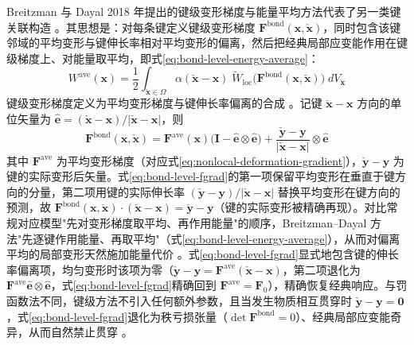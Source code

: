 Breitzman 与 Dayal 2018 年提出的键级变形梯度与能量平均方法代表了另一类键关联构造 \cite{BreitzmanDayal2018}。其思想是：对每条键定义键级变形梯度 $\mathbf{F}^{\mathrm{bond}}(\mathbf{x},\check{\mathbf{x}})$，同时包含该键邻域的平均变形与键伸长率相对平均变形的偏离，然后把经典局部应变能作用在键级梯度上、对能量取平均，即式\eqref{eq:bond-level-energy-average}：
\begin{equation}
  W^{\mathrm{ave}}(\mathbf{x})
  =\frac{1}{2}\int_{\check{\mathbf{x}}\in\Omega}\alpha(\check{\mathbf{x}}-\mathbf{x})\;
  \widetilde{W}_{\mathrm{loc}}\bigl(\mathbf{F}^{\mathrm{bond}}(\mathbf{x},\check{\mathbf{x}})\bigr)\;dV_{\check{\mathbf{x}}}
  \label{eq:bond-level-energy-average}
\end{equation}
键级变形梯度定义为平均变形梯度与键伸长率偏离的合成 \cite{BreitzmanDayal2018}。记键 $\check{\mathbf{x}}-\mathbf{x}$ 方向的单位矢量为 $\hat{\mathbf{e}}=(\check{\mathbf{x}}-\mathbf{x})/|\check{\mathbf{x}}-\mathbf{x}|$，则
\begin{equation}
  \mathbf{F}^{\mathrm{bond}}(\mathbf{x},\check{\mathbf{x}})
  =\mathbf{F}^{\mathrm{ave}}(\mathbf{x})\bigl(\mathbf{I}-\hat{\mathbf{e}}\otimes\hat{\mathbf{e}}\bigr)
  +\frac{\check{\mathbf{y}}-\mathbf{y}}{|\check{\mathbf{x}}-\mathbf{x}|}\otimes\hat{\mathbf{e}}
  \label{eq:bond-level-fgrad}
\end{equation}
其中 $\mathbf{F}^{\mathrm{ave}}$ 为平均变形梯度（对应式\eqref{eq:nonlocal-deformation-gradient}），$\check{\mathbf{y}}-\mathbf{y}$ 为键的实际变形后矢量。式\eqref{eq:bond-level-fgrad}的第一项保留平均变形在垂直于键方向的分量，第二项用键的实际伸长率 $(\check{\mathbf{y}}-\mathbf{y})/|\check{\mathbf{x}}-\mathbf{x}|$ 替换平均变形在键方向的预测，故 $\mathbf{F}^{\mathrm{bond}}(\mathbf{x},\check{\mathbf{x}})\cdot(\check{\mathbf{x}}-\mathbf{x})=\check{\mathbf{y}}-\mathbf{y}$（键的实际变形被精确再现）。对比常规对应模型"先对变形梯度取平均、再作用能量"的顺序，Breitzman–Dayal 方法"先逐键作用能量、再取平均"（式\eqref{eq:bond-level-energy-average}），从而对偏离平均的局部变形天然施加能量代价 \cite{BreitzmanDayal2018}。式\eqref{eq:bond-level-fgrad}显式地包含键的伸长率偏离项，均匀变形时该项为零（$\check{\mathbf{y}}-\mathbf{y}=\mathbf{F}^{\mathrm{ave}}(\check{\mathbf{x}}-\mathbf{x})$，第二项退化为 $\mathbf{F}^{\mathrm{ave}}\hat{\mathbf{e}}\otimes\hat{\mathbf{e}}$，式\eqref{eq:bond-level-fgrad}精确回到 $\mathbf{F}^{\mathrm{ave}}=\mathbf{F}_{0}$），精确恢复经典响应。与罚函数法不同，键级方法不引入任何额外参数，且当发生物质相互贯穿时 $\check{\mathbf{y}}-\mathbf{y}=\mathbf{0}$，式\eqref{eq:bond-level-fgrad}退化为秩亏损张量（$\det\mathbf{F}^{\mathrm{bond}}=0$）、经典局部应变能奇异，从而自然禁止贯穿 \cite{BreitzmanDayal2018}。

